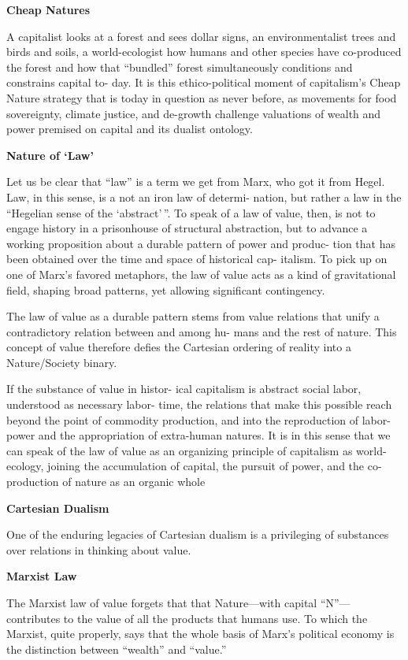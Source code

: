 \documentclass[
]{book}
\begin{document}
\textbf{Cheap Natures}

A capitalist looks at a forest and sees dollar signs,
an environmentalist trees and birds and soils, a world-ecologist how
humans and other species have co-produced the forest and how that
``bundled'' forest simultaneously conditions and constrains capital to-
day. It is this ethico-political moment of capitalism's Cheap Nature
strategy that is today in question as never before, as movements for
food sovereignty, climate justice, and de-growth challenge valuations
of wealth and power premised on capital and its dualist ontology.

\textbf{Nature of `Law'}

Let us be clear that ``law'' is a term we get from Marx, who
got it from Hegel. Law, in this sense, is a not an iron law of determi-
nation, but rather a law in the ``Hegelian sense of the `abstract'\,''.
To speak of a law of value, then, is not to engage
history in a prisonhouse of structural abstraction, but to advance a
working proposition about a durable pattern of power and produc-
tion that has been obtained over the time and space of historical cap-
italism. To pick up on one of Marx's favored metaphors, the law of
value acts as a kind of gravitational field, shaping broad patterns, yet
allowing significant contingency.

The law of value as a durable pattern stems from value
relations that unify a contradictory relation between and among hu-
mans and the rest of nature. This concept of value therefore defies
the Cartesian ordering of reality into a Nature/Society binary.

If the substance of value in histor-
ical capitalism is abstract social labor, understood as necessary labor-
time, the relations that make this possible reach beyond the point of
commodity production, and into the reproduction of labor-power
and the appropriation of extra-human natures.
It is in this sense that
we can speak of the law of value as an organizing principle of capitalism
as world-ecology, joining the accumulation of capital, the pursuit
of power, and the co-production of nature as an organic whole

\textbf{Cartesian Dualism}

One of the enduring legacies of Cartesian dualism is a
privileging of substances over relations in thinking about value.

\textbf{Marxist Law}

The Marxist law of value forgets that that Nature---with capital ``N''---contributes to the
value of all the products that humans use. To which the Marxist, quite
properly, says that the whole basis of Marx's political economy is the
distinction between ``wealth'' and ``value.''
\end{document}

